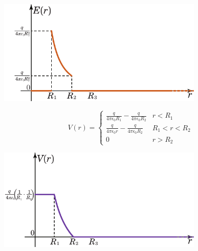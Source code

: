 \begin{center}
	\includegraphics[width=0.75\textwidth]{images/chp4/chp4sferacava4graf1.pdf}
\end{center}
\begin{equation*}
	V(r)=\begin{cases}
		\frac{q}{4\pi\epsilon_0R_1}-\frac{q}{4\pi\epsilon_0R_2} & r<R_1\\
		\frac{q}{4\pi\epsilon_0r}-\frac{q}{4\pi\epsilon_0R_2} & R_1<r<R_2\\
		0 & r>R_2
	\end{cases}
\end{equation*}
\begin{center}
	\includegraphics[width=0.75\textwidth]{images/chp4/chp4sferacava4graf2.pdf}
\end{center}

